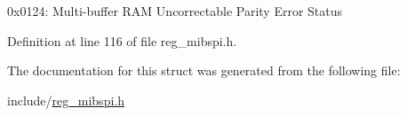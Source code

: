 0x0124\+: Multi-\/buffer R\+AM Uncorrectable Parity Error Status 

Definition at line 116 of file reg\+\_\+mibspi.\+h.



The documentation for this struct was generated from the following file\+:\begin{DoxyCompactItemize}
\item 
include/\mbox{\hyperlink{reg__mibspi_8h}{reg\+\_\+mibspi.\+h}}\end{DoxyCompactItemize}
